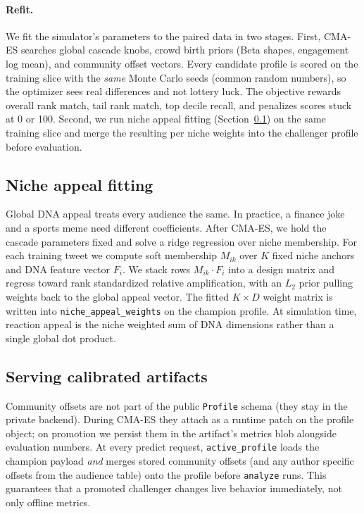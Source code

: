 \documentclass[11pt]{article}
\begin{document}
\paragraph{Refit.}
We fit the simulator's parameters to the paired data in two stages. First,
CMA-ES \cite{hansen2016cma} searches global cascade knobs, crowd birth priors
(Beta shapes, engagement log mean), and community offset vectors. Every
candidate profile is scored on the training slice with the \emph{same} Monte
Carlo seeds (common random numbers), so the optimizer sees real differences and
not lottery luck. The objective rewards overall rank match, tail rank match, top
decile recall, and penalizes scores stuck at 0 or 100. Second, we run niche
appeal fitting (Section~\ref{sec:niche-appeal}) on the same training slice and
merge the resulting per niche weights into the challenger profile before
evaluation.

\subsection{Niche appeal fitting}
\label{sec:niche-appeal}
Global DNA appeal treats every audience the same. In practice, a finance joke and
a sports meme need different coefficients. After CMA-ES, we hold the cascade
parameters fixed and solve a ridge regression over niche membership. For each
training tweet we compute soft membership $M_{ik}$ over $K$ fixed niche
anchors and DNA feature vector $F_i$. We stack rows $M_{ik} \cdot F_i$ into a
design matrix and regress toward rank standardized relative amplification, with
an $L_2$ prior pulling weights back to the global appeal vector. The fitted
$K \times D$ weight matrix is written into \texttt{niche\_appeal\_weights} on the
champion profile. At simulation time, reaction appeal is the niche weighted sum
of DNA dimensions rather than a single global dot product.

\subsection{Serving calibrated artifacts}
Community offsets are not part of the public \texttt{Profile} schema (they stay
in the private backend). During CMA-ES they attach as a runtime patch on the
profile object; on promotion we persist them in the artifact's metrics blob
alongside evaluation numbers. At every predict request, \texttt{active\_profile}
loads the champion payload \emph{and} merges stored community offsets (and any
author specific offsets from the audience table) onto the profile before
\texttt{analyze} runs. This guarantees that a promoted challenger changes live
behavior immediately, not only offline metrics.
\end{document}
